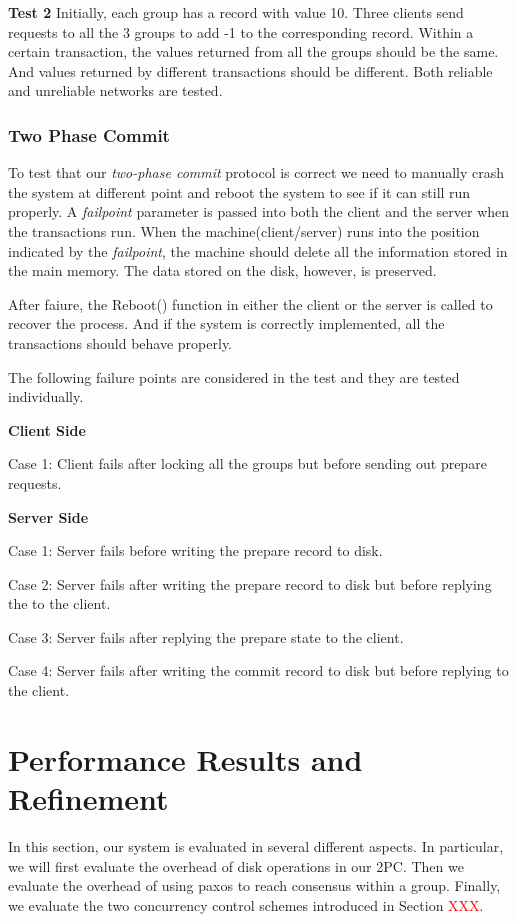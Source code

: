 \documentclass{vldb}
\begin{document}
\textbf{Test 2} Initially, each group has a record with value 10.  
Three clients send requests to all the 3 groups to add -1 to the 
corresponding record. Within a certain transaction, the values 
returned from all the groups should be the same. And values returned 
by different transactions should be different. Both reliable and 
unreliable networks are tested.

\subsubsection{Two Phase Commit}

To test that our \textit{two-phase commit} protocol is correct we need 
to manually crash the system at different point and reboot the system 
to see if it can still run properly. A \textit{failpoint} parameter is 
passed into both the client and the server when the transactions run.  
When the machine(client/server) runs into the position indicated by 
the \textit{failpoint}, the machine should delete all the information 
stored in the main memory. The data stored on the disk, however, is 
preserved.

After faiure, the Reboot() function in either the client or the server 
is called to recover the process. And if the system is correctly 
implemented, all the transactions should behave properly.

The following failure points are considered in the test and they are 
tested individually.

\textbf{Client Side}

Case 1: Client fails after locking all the groups but before sending 
out prepare requests.

\textbf{Server Side}

Case 1: Server fails before writing the prepare record to disk.

Case 2: Server fails after writing the prepare record to disk but 
before replying the to the client.

Case 3: Server fails after replying the prepare state to the client.

Case 4: Server fails after writing the commit record to disk but 
before replying to the client.


\section{Performance Results and Refinement}

In this section, our system is evaluated in several different aspects.  
In particular, we will first evaluate the overhead of disk operations 
in our 2PC. Then we evaluate the overhead of using paxos to reach 
consensus within a group. Finally, we evaluate the two concurrency 
control schemes introduced in Section \textcolor{red}{XXX}.
\end{document}
